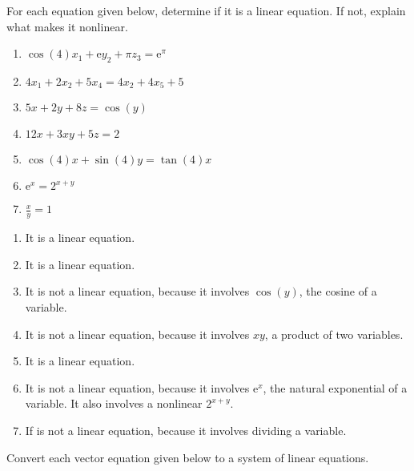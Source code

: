 \begin{exercises}
	\begin{problist}
		\prob For each equation given below, determine if it is a linear
		equation. If not, explain what makes it nonlinear.
		\begin{enumerate}
			\item $\cos(4)x_{1}+\mathrm{e}y_{2}+\pi z_{3}=\mathrm{e}^{\pi}$

			\item $4x_{1}+2x_{2}+5x_{4}=4x_{2}+4x_{5}+5$

			\item $5x+2y+8z=\cos(y)$

			\item $12x+3xy+5z=2$

			\item $\cos(4)x+\sin(4)y=\tan(4)x$

			\item $\mathrm{e}^{x}=2^{x+y}$

			\item $\frac{x}{y}=1$
		\end{enumerate}
		\begin{solution}
			\begin{enumerate}
				\item It is a linear equation.

				\item It is a linear equation.

				\item It is not a linear equation, because it involves $\cos(y)$,
					the cosine of a variable.

				\item It is not a linear equation, because it involves $xy$, a product
					of two variables.

				\item It is a linear equation.

				\item It is not a linear equation, because it involves
					$\mathrm{e}^{x}$, the natural exponential of a variable. It
					also involves a nonlinear $2^{x+y}$.

				\item If is not a linear equation, because it involves dividing
					a variable.
			\end{enumerate}
		\end{solution}

		\prob Convert each vector equation given below to a system of linear
		equations.


\end{problist}
\end{exercises}

